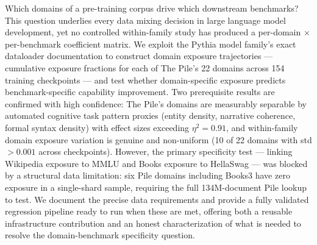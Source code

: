 Which domains of a pre-training corpus drive which downstream benchmarks? This question underlies every data mixing decision in large language model development, yet no controlled within-family study has produced a per-domain $\times$ per-benchmark coefficient matrix. We exploit the Pythia model family's exact dataloader documentation to construct domain exposure trajectories --- cumulative exposure fractions for each of The Pile's 22 domains across 154 training checkpoints --- and test whether domain-specific exposure predicts benchmark-specific capability improvement. Two prerequisite results are confirmed with high confidence: The Pile's domains are measurably separable by automated cognitive task pattern proxies (entity density, narrative coherence, formal syntax density) with effect sizes exceeding $\eta^2 = 0.91$, and within-family domain exposure variation is genuine and non-uniform (10 of 22 domains with std $> 0.001$ across checkpoints). However, the primary specificity test --- linking Wikipedia exposure to MMLU and Books exposure to HellaSwag --- was blocked by a structural data limitation: six Pile domains including Books3 have zero exposure in a single-shard sample, requiring the full 134M-document Pile lookup to test. We document the precise data requirements and provide a fully validated regression pipeline ready to run when these are met, offering both a reusable infrastructure contribution and an honest characterization of what is needed to resolve the domain-benchmark specificity question.
